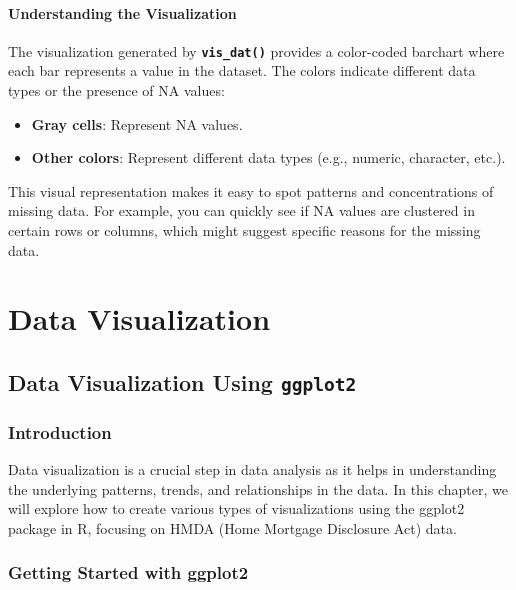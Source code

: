 \documentclass[
]{book}
\providecommand{\tightlist}{%
  \setlength{\itemsep}{0pt}\setlength{\parskip}{0pt}}
\begin{document}
\hypertarget{understanding-the-visualization}{%
\subsubsection*{Understanding the Visualization}\label{understanding-the-visualization}}

The visualization generated by \textbf{\texttt{vis\_dat()}} provides a color-coded barchart where each bar represents a value in the dataset. The colors indicate different data types or the presence of NA values:

\begin{itemize}
\tightlist
\item
  \textbf{Gray cells}: Represent NA values.
\item
  \textbf{Other colors}: Represent different data types (e.g., numeric, character, etc.).
\end{itemize}

This visual representation makes it easy to spot patterns and concentrations of missing data. For example, you can quickly see if NA values are clustered in certain rows or columns, which might suggest specific reasons for the missing data.

\hypertarget{data-visualization}{%
\chapter{Data Visualization}\label{data-visualization}}

\hypertarget{data-visualization-using-ggplot2}{%
\section{\texorpdfstring{Data Visualization Using \texttt{ggplot2}}{Data Visualization Using ggplot2}}\label{data-visualization-using-ggplot2}}

\hypertarget{introduction-1}{%
\subsection{Introduction}\label{introduction-1}}

Data visualization is a crucial step in data analysis as it helps in understanding the underlying patterns, trends, and relationships in the data. In this chapter, we will explore how to create various types of visualizations using the ggplot2 package in R, focusing on HMDA (Home Mortgage Disclosure Act) data.

\hypertarget{getting-started-with-ggplot2}{%
\subsection{Getting Started with ggplot2}\label{getting-started-with-ggplot2}}
\end{document}

